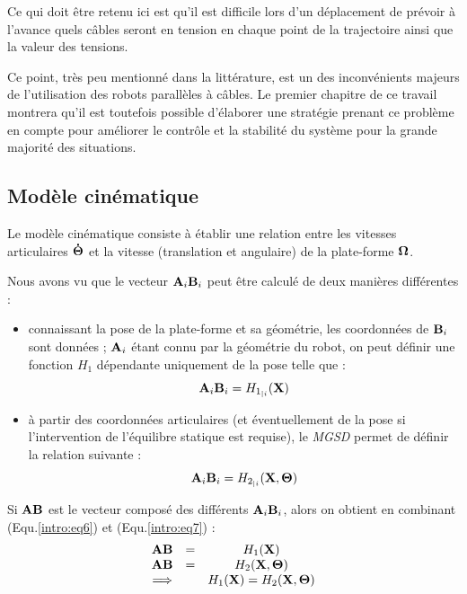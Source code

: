 Ce qui doit \^etre retenu ici est qu'il est difficile lors d'un déplacement de 
prévoir à l'avance quels câbles seront en tension en chaque point de la 
trajectoire ainsi que la valeur des tensions.

Ce point, très peu mentionné dans la littérature, est un des inconvénients 
majeurs de l'utilisation des robots parallèles à câbles. Le premier chapitre de 
ce travail montrera qu'il est toutefois possible d'élaborer une stratégie 
prenant ce problème en compte pour améliorer le contrôle et la stabilité du 
système pour la grande majorité des situations.

\subsection{Modèle cinématique}\label{chap0-1-5}

Le modèle cinématique consiste à établir une relation entre les 
vitesses articulaires ${\bf \dot \Theta}$ et la vitesse (translation et 
angulaire) de la plate-forme $\bf \Omega$.

Nous avons vu que le vecteur ${\bf A}_i{\bf B}_i$ peut être calculé de deux 
manières différentes :
\begin{itemize}
 \item connaissant la pose de la plate-forme et sa géométrie, les coordonnées 
de 
${\bf B}_i$ sont données ; ${\bf A}_i$ étant connu par la géométrie du robot, 
on 
peut définir une fonction $H_1$ dépendante uniquement de la pose telle que :
\begin{equation}
{\bf A}_i{\bf B}_i = H_{1_{|i}}({\bf X})
\label{intro:eq6}
\end{equation}
 \item à partir des coordonnées articulaires (et éventuellement de la pose si 
l'intervention de l'équilibre statique est requise), le {\it MGSD} permet de 
définir la relation suivante :
\begin{equation}
{\bf A}_i{\bf B}_i = H_{2_{|i}}({\bf X}, {\bf \Theta})
\label{intro:eq7}
\end{equation}
\end{itemize}
 
Si ${\bf AB}$ est le vecteur composé des différents ${\bf A}_i{\bf B}_i$, alors 
on obtient en combinant (Equ.\ref{intro:eq6}) et (Equ.\ref{intro:eq7}) :
\begin{equation}
\begin{matrix}
{\bf AB} &=& H_1({\bf X}) \\
{\bf AB} &=& H_2({\bf X}, {\bf \Theta}) \\
\Longrightarrow & & H_1({\bf X}) = H_2({\bf X}, {\bf \Theta})
\end{matrix}
\label{intro:eq8}
\end{equation}

